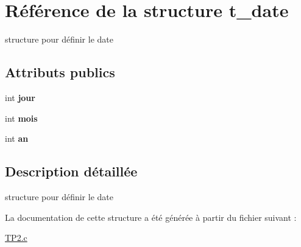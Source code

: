 \hypertarget{structt__date}{\section{Référence de la structure t\-\_\-date}
\label{structt__date}
}


structure pour définir le date  


\subsection*{Attributs publics}
\begin{DoxyCompactItemize}
\item 
\hypertarget{structt__date_ae4260737f075857a18d563a15a54748b}{int {\bfseries jour}}\label{structt__date_ae4260737f075857a18d563a15a54748b}

\item 
\hypertarget{structt__date_afdb9c3ed266dbb4dec0fd2abd57c5c64}{int {\bfseries mois}}\label{structt__date_afdb9c3ed266dbb4dec0fd2abd57c5c64}

\item 
\hypertarget{structt__date_a814a37bacf0a07f108bd826b774af59f}{int {\bfseries an}}\label{structt__date_a814a37bacf0a07f108bd826b774af59f}

\end{DoxyCompactItemize}


\subsection{Description détaillée}
structure pour définir le date 

La documentation de cette structure a été générée à partir du fichier suivant \-:\begin{DoxyCompactItemize}
\item 
\hyperlink{TP2_8c}{T\-P2.\-c}\end{DoxyCompactItemize}

